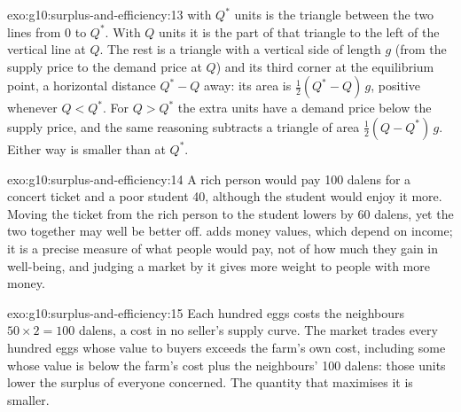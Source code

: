 \begin{solution}{exo:g10:surplus-and-efficiency:13}
 with $Q^*$ units is the triangle between the two lines from 0 to $Q^*$. With $Q$ units it is the part of that triangle to the left of the vertical
line at $Q$. The rest is a triangle with a vertical side of length $g$ (from the supply price to the demand price at $Q$) and its third corner at the equilibrium
point, a horizontal distance $Q^* - Q$ away: its area is $\tfrac12 (Q^* - Q)\,g$, positive whenever $Q < Q^*$. For $Q > Q^*$ the extra units have a demand price
below the supply price, and the same reasoning subtracts a triangle of area $\tfrac12 (Q - Q^*)\,g$. Either way  is smaller than at $Q^*$.
\end{solution}

\begin{solution}{exo:g10:surplus-and-efficiency:14}
A rich person would pay 100 dalens for a concert ticket and a poor student 40, although the student would enjoy it more. Moving the ticket from the rich person
to the student lowers  by 60 dalens, yet the two together may well be better off.  adds money values, which depend on income; it is a
precise measure of what people would pay, not of how much they gain in well-being, and judging a market by it gives more weight to people with more money.
\end{solution}

\begin{solution}{exo:g10:surplus-and-efficiency:15}
Each hundred eggs costs the neighbours $50 \times 2 = 100$ dalens, a cost in no seller's supply curve. The market trades every hundred eggs whose value to buyers
exceeds the farm's own cost, including some whose value is below the farm's cost plus the neighbours' 100 dalens: those units lower the surplus of everyone
concerned. The quantity that maximises it is smaller.
\end{solution}

